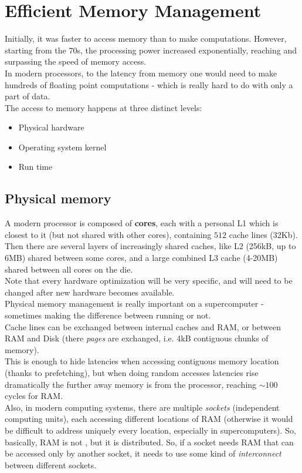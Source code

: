 \documentclass[../template.tex]{subfiles}
\begin{document}
\chapter{Efficient Memory Management}
Initially, it was faster to access memory than to make computations. However, starting from the 70s, the processing power increased exponentially, reaching and surpassing the speed of memory access.\\
In modern processors, to  the latency from memory one would need to make hundreds of floating point computations - which is really hard to do with only a part of data.\\

The access to memory happens at three distinct levels:
\begin{itemize}
    \item Physical hardware
    \item Operating system kernel
    \item Run time
\end{itemize}

\section{Physical memory}
A modern processor is composed of \textbf{cores}, each with a personal L1 which is closest to it (but not shared with other cores), containing $512$ cache lines (32Kb). Then there are several layers of increasingly shared caches, like L2 (256kB, up to 6MB) shared between some cores, and a large combined L3 cache (4-20MB) shared between all cores on the die.\\
Note that every hardware optimization will be very specific, and will need to be changed after new hardware becomes available.\\
Physical memory management is really important on a supercomputer - sometimes making the difference between running or not.\\

Cache lines can be exchanged between internal caches and RAM, or between RAM and Disk (there \textit{pages} are exchanged, i.e. 4kB contiguous chunks of memory).\\
This is enough to hide latencies when accessing contiguous memory location (thanks to prefetching), but when doing random accesses latencies rise dramatically the further away memory is from the processor, reaching $\sim 100$ cycles for RAM.\\
Also, in modern computing systems, there are multiple \textit{sockets} (independent computing  units), each accessing different locations of RAM (otherwise it would be difficult to address uniquely every location, especially in supercomputers). So, basically, RAM is not , but it is distributed. So, if a socket needs RAM that can be accessed only by another socket, it needs to use some kind of \textit{interconnect} between different sockets.
\end{document}
